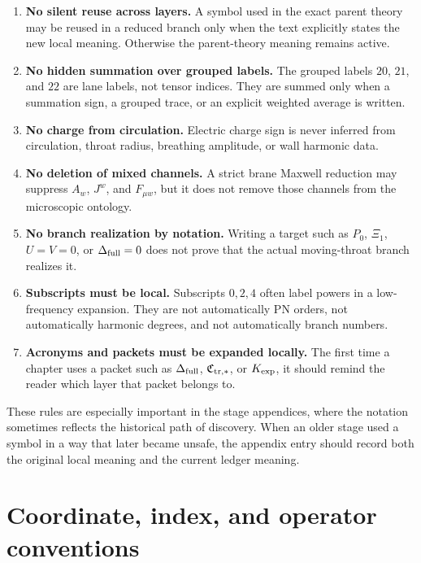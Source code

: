 \begin{enumerate}[leftmargin=2.2em]
  \item \textbf{No silent reuse across layers.}  A symbol used in the exact parent theory may be reused in a reduced branch only when the text explicitly states the new local meaning.  Otherwise the parent-theory meaning remains active.
  \item \textbf{No hidden summation over grouped labels.}  The grouped labels \(20\), \(21\), and \(22\) are lane labels, not tensor indices.  They are summed only when a summation sign, a grouped trace, or an explicit weighted average is written.
  \item \textbf{No charge from circulation.}  Electric charge sign is never inferred from circulation, throat radius, breathing amplitude, or wall harmonic data.
  \item \textbf{No deletion of mixed channels.}  A strict brane Maxwell reduction may suppress \(A_w\), \(J^w\), and \(F_{\mu w}\), but it does not remove those channels from the microscopic ontology.
  \item \textbf{No branch realization by notation.}  Writing a target such as \(P_0\), \(\Xi_1\), \(U=V=0\), or \(\Delta_{\rm full}=0\) does not prove that the actual moving-throat branch realizes it.
  \item \textbf{Subscripts must be local.}  Subscripts \(0,2,4\) often label powers in a low-frequency expansion.  They are not automatically PN orders, not automatically harmonic degrees, and not automatically branch numbers.
  \item \textbf{Acronyms and packets must be expanded locally.}  The first time a chapter uses a packet such as \(\Delta_{\rm full}\), \(\mathfrak C_{{\rm tr},*}\), or \(K_{\rm exp}\), it should remind the reader which layer that packet belongs to.
\end{enumerate}

These rules are especially important in the stage appendices, where the notation sometimes reflects the historical path of discovery.  When an older stage used a symbol in a way that later became unsafe, the appendix entry should record both the original local meaning and the current ledger meaning.

\section{Coordinate, index, and operator conventions}
\label{sec:notation-coordinates-indices}

